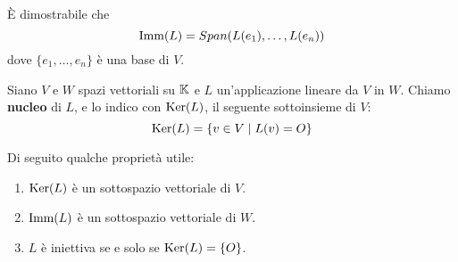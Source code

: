 \begin{proposition}
	È dimostrabile che \[ \operatorname{Imm}(L) = Span(L(e_1), \dots, L(e_n)) \] dove $\{e_1, \dots, e_n\}$ è una base di $V$.
\end{proposition}

\begin{definition}
	Siano $V$ e $W$ spazi vettoriali su $\mathbb{K}$ e $L$ un'applicazione lineare da $V$ in $W$. Chiamo
	\textbf{nucleo} di $L$, e lo indico con $\operatorname{Ker}(L)$, il seguente sottoinsieme di $V$:
	\[ \operatorname{Ker}(L) = \{v \in V \mid L(v) = O\} \]
\end{definition}

Di seguito qualche proprietà utile:
\begin{enumerate}
	\item $\operatorname{Ker}(L)$ è un sottospazio vettoriale di $V$.
	\item $\operatorname{Imm}(L)$ è un sottospazio vettoriale di $W$.
	\item $L$ è iniettiva se e solo se $\operatorname{Ker}(L) = \{O\}$.
\end{enumerate}

